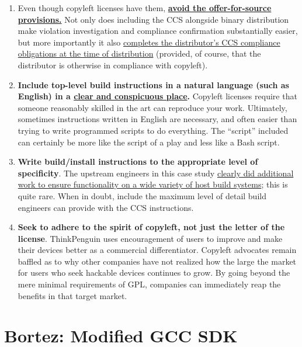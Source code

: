 \begin{enumerate}

\item Even though copyleft licenses have them,
  \hyperref[thinkpenguin-included-ccs]{\bf avoid the offer-for-source
    provisions.}  Not only does including the CCS alongside binary
  distribution make violation investigation and compliance confirmation
  substantially easier, but more importantly it also
  \hyperref[offer-for-source]{completes the distributor's CCS compliance
    obligations at the time of distribution} (provided, of course, that the
  distributor is otherwise in compliance with copyleft).
  
\item {\bf Include top-level build instructions in a natural language (such
  as English) in a \hyperref[thinkpenguin-toplevel-readme]{clear and
    conspicuous place}.}  Copyleft licenses require that someone reasonably
  skilled in the art can reproduce your work.  Ultimately, sometimes
  instructions written in English are necessary, and often easier than trying
  to write programmed scripts to do everything.  The ``script'' included can
  certainly be more like the script of a play and less like a Bash script.

\item {\bf Write build/install instructions to the appropriate level of
  specificity}.  The upstream engineers
  in this case study \hyperref[thinkpenguin-specific-host-system]{clearly did
    additional work to ensure functionality on a wide variety of host build
    systems}; this is quite rare.  When in doubt, include the maximum level
  of detail build engineers can provide with the CCS instructions.

\item {\bf Seek to adhere to the spirit of copyleft, not just the letter of
  the license}.  ThinkPenguin uses encouragement of  users to improve and
  make their devices better as a commercial differentiator.  Copyleft advocates
  remain baffled as to why other companies have not realized how the large the
  market for
  users who seek hackable devices continues to grow.  By going beyond the
  mere minimal requirements of GPL, companies can immediately reap the
  benefits in that target market.
  
\end{enumerate}

\chapter{Bortez: Modified GCC SDK}

